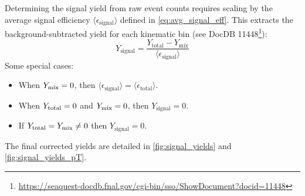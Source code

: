\documentclass[11pt]{article}
\begin{document}
Determining the signal yield from raw event counts requires scaling by the average signal efficiency $\langle\epsilon_{\text{signal}}\rangle$ defined in \cref{eq:avg_signal_eff}. This extracts the background-subtracted yield for each kinematic bin (see DocDB 11448\footnote{\url{https://seaquest-docdb.fnal.gov/cgi-bin/sso/ShowDocument?docid=11448}}):
\begin{equation}
\label{eq:y_signal}
    Y_{\text{signal}} = \frac{Y_{\text{total}}-Y_{\text{mix}}}{\langle\epsilon_{\text{signal}}\rangle}
\end{equation}
Some special cases:
\begin{itemize}
\item When $Y_{\rm mix}=0$, then $\langle\epsilon_{\text{signal}}\rangle = \langle\epsilon_{\text{total}}\rangle$.
\item When $Y_{\rm total}=0$ and $Y_{\rm mix}=0$, then $Y_{\text{signal}} = 0$. 
\item If $Y_{\rm total}=Y_{\rm mix}\neq 0$ then $Y_{\text{signal}} = 0$.
\end{itemize}
The final corrected yields are detailed in \cref{fig:signal_yields} and \cref{fig:signal_yields_pT}.
\end{document}
